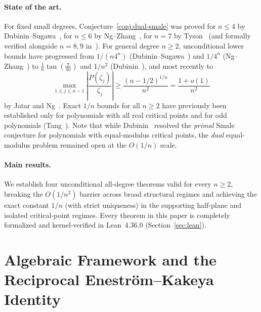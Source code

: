 \documentclass[11pt,a4paper]{article}
\theoremstyle{definition}
\theoremstyle{remark}
\begin{document}
\paragraph{State of the art.}
For fixed small degrees, Conjecture~\ref{conj:dual-smale} was proved for $n \le 4$ by Dubinin--Sugawa~\cite{DubininSugawa2009}, for $n \le 6$ by Ng--Zhang~\cite{NgZhang2016}, for $n = 7$ by Tyson~\cite{Tyson2019} (and formally verified alongside $n = 8, 9$ in~\cite{BesevicN8,BesevicN9}).
For general degree $n \ge 2$, unconditional lower bounds have progressed from $1/(n 4^n)$ (Dubinin--Sugawa~\cite{DubininSugawa2009}) and $1/4^n$ (Ng--Zhang~\cite{NgZhang2016}) to $\frac{1}{n}\tan(\frac{\pi}{4n})$ and $1/n^2$ (Dubinin~\cite{Dubinin2019}), and most recently to
\[
\max_{1 \le j \le n-1} \left|\frac{P(\zeta_j)}{\zeta_j}\right| \ge \frac{(n - 1/2)^{1/n}}{n^2} = \frac{1 + o(1)}{n^2}
\]
by Jatar and Ng~\cite{JatarNg2026}. Exact $1/n$ bounds for all $n \ge 2$ have previously been established only for polynomials with all real critical points and for odd polynomials (Tang~\cite{Tang2025}). Note that while Dubinin~\cite{Dubinin2006} resolved the \emph{primal} Smale conjecture for polynomials with equal-modulus critical points, the \emph{dual} equal-modulus problem remained open at the $O(1/n)$ scale.

\paragraph{Main results.}
We establish four unconditional all-degree theorems valid for every $n \ge 2$, breaking the $O(1/n^2)$ barrier across broad structural regimes and achieving the exact constant $1/n$ (with strict uniqueness) in the supporting half-plane and isolated critical-point regimes. Every theorem in this paper is completely formalized and kernel-verified in Lean~4.36.0 (Section~\ref{sec:lean}).

\section{Algebraic Framework and the Reciprocal Enestr\"om--Kakeya Identity}
\end{document}
